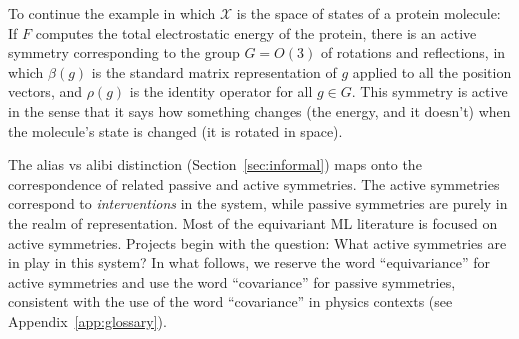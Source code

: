 \documentclass[accepted]{article}
\renewcommand{\mathcal}[1]{\mathscr{#1}} %
\newcommand{\sectionname}{Section}
\newcommand{\secref}[1]{\sectionname~\ref{#1}}
\newcommand{\appref}[1]{Appendix~\ref{#1}}
\begin{document}
To continue the example in which $\mathcal{X}$ is the space of states of a protein molecule:
If $F$ computes the total electrostatic energy of the protein, there is an active symmetry corresponding to the group $G=O(3)$ of rotations and reflections, in which $\beta(g)$ is the standard matrix representation of $g$ applied to all the position vectors, and $\rho(g)$ is the identity operator for all $g\in G$.
This symmetry is active in the sense that it says how something changes (the energy, and it doesn't) when the molecule's state is changed (it is rotated in space).

The alias vs alibi distinction (\secref{sec:informal}) maps onto the correspondence of related passive and active symmetries.
The active symmetries correspond to \emph{interventions} in the system, while passive symmetries are purely in the realm of representation.
Most of the equivariant ML literature is focused on active symmetries.
Projects begin with the question: What active symmetries are in play in this system?
In what follows, we reserve the word ``equivariance'' for active symmetries and use the word ``covariance'' for passive symmetries, consistent with the use of the word ``covariance'' in physics contexts (see \appref{app:glossary}).

\end{document}
